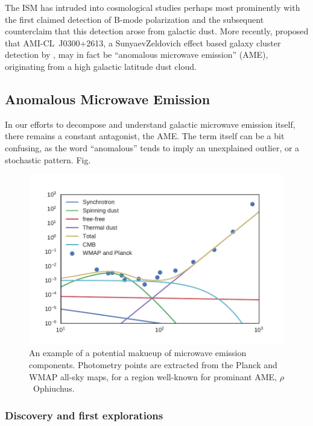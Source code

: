     The ISM has intruded into cosmological studies perhaps most prominently with the first claimed detection of B-mode polarization \citep{hanson13, bicep214, flauger14} and the subsequent counter\-claim that this detection arose from galactic dust. More recently, \cite{perrott18} proposed that AMI-CL~J0300+2613, a Sunyaev\-Zeldovich effect based galaxy cluster detection  by \cite{shimwell12}, may in fact be ``anomalous microwave emission'' (AME), originating from a high galactic latitude dust cloud.

  \subsection{Anomalous Microwave Emission}

      In our efforts to decompose and understand galactic microwave emission itself, there remains a constant antagonist, the AME. The term itself can be a bit confusing, as the word ``anomalous'' tends to imply an unexplained outlier, or a stochastic pattern. Fig.



    \begin{figure}
      \label{fig:mw_foregrounds_demo_rOph}
      \centering
      \includegraphics[width=\textwidth]{../Plots/ch_intro/mw_foregrounds_demo_rOph.pdf}
      \caption{An example of a potential makueup of microwave emission components. Photometry points are extracted from the Planck and WMAP all-sky maps, for a region well-known for prominant AME, $\rho$~Ophiuchus. \citep{planckxx11}}
    \end{figure}

    \subsubsection{Discovery and first explorations}

